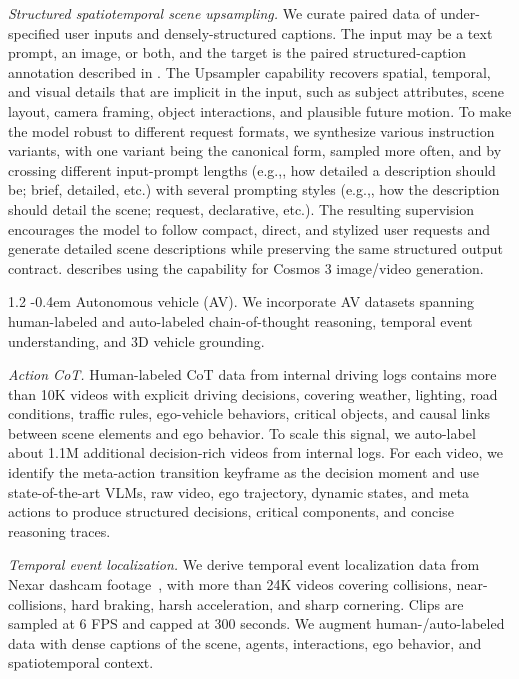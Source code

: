 \documentclass{llmxive}
\makeatletter
\providecommand{\eg}{e.g.,\xspace}
\providecommand{\etc}{etc.\xspace}
\providecommand{\paragraph}{  \@startsection{paragraph}{4}{\z@}    {1\baselineskip \@plus .2\baselineskip}    {-0.4em}    {\normalfont\normalsize\bfseries}}
\makeatother
\begin{document}
\textit{Structured spatiotemporal scene upsampling.} 
We curate paired data of under-specified user inputs and densely-structured captions. The input  may be a text prompt, an image, or both, and the target is the paired structured-caption annotation described in . The Upsampler capability recovers spatial, temporal, and visual details that are implicit in the input, such as subject attributes, scene layout, camera framing, object interactions, and plausible future motion. To make the model robust to different request formats, we synthesize various instruction variants, with one variant being the canonical form, sampled more often, and by crossing different input-prompt lengths (\eg, how detailed a description should be; brief, detailed, \etc)  with several prompting styles (\eg, how the description should detail the scene; request, declarative, \etc). The resulting supervision encourages the model to follow compact, direct, and stylized user requests and generate detailed scene descriptions while preserving the same structured output contract.  describes using the capability for Cosmos 3 image/video generation.

\paragraph{Autonomous vehicle (AV).} We incorporate AV datasets spanning human-labeled and auto-labeled chain-of-thought reasoning, temporal event understanding, and 3D vehicle grounding.

\textit{Action CoT.} Human-labeled CoT data from internal driving logs contains more than 10K videos with explicit driving decisions, covering weather, lighting, road conditions, traffic rules, ego-vehicle behaviors, critical objects, and causal links between scene elements and ego behavior. To scale this signal, we auto-label about 1.1M additional decision-rich videos from internal logs. For each video, we identify the meta-action transition keyframe as the decision moment and use state-of-the-art VLMs, raw video, ego trajectory, dynamic states, and meta actions to produce structured decisions, critical components, and concise reasoning traces.

\textit{Temporal event localization.} We derive temporal event localization data from Nexar dashcam footage~\citep{dmoura2025nexar}, with more than 24K videos covering collisions, near-collisions, hard braking, harsh acceleration, and sharp cornering. Clips are sampled at 6 FPS and capped at 300 seconds. We augment human-/auto-labeled data with dense captions of the scene, agents, interactions, ego behavior, and spatiotemporal context.
\end{document}
